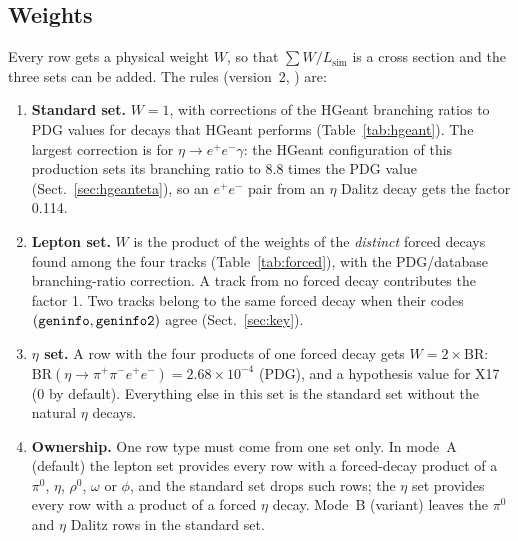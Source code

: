 \documentclass[11pt,a4paper]{article}
\newcommand{\piz}{\ensuremath{\pi^{0}}\xspace}
\newcommand{\ee}{\ensuremath{e^{+}e^{-}}\xspace}
\newcommand{\ppee}{\ensuremath{\pi^{+}\pi^{-}e^{+}e^{-}}\xspace}
\newcommand{\Lsim}{\ensuremath{L_{\mathrm{sim}}}\xspace}
\newcommand{\code}[1]{\texttt{\detokenize{#1}}}
\begin{document}
\subsection{Weights}
\label{sec:weights}
Every row gets a physical weight $W$, so that $\sum W/\Lsim$ is a cross section and the
three sets can be added. The rules (version~2, \code{src/sim_truth.h}) are:
\begin{enumerate}
\item \textbf{Standard set.} $W=1$, with corrections of the HGeant branching ratios to PDG
      values for decays that HGeant performs (Table~\ref{tab:hgeant}). The largest correction
      is for $\eta\to\ee\gamma$: the HGeant configuration of this production sets its branching
      ratio to 8.8 times the PDG value (Sect.~\ref{sec:hgeanteta}), so an \ee pair from an $\eta$
      Dalitz decay gets the factor 0.114.
\item \textbf{Lepton set.} $W$ is the product of the weights of the \emph{distinct} forced
      decays found among the four tracks (Table~\ref{tab:forced}), with the PDG/database
      branching-ratio correction. A track from no forced decay contributes the factor 1.
      Two tracks belong to the same forced decay when their codes $(\code{geninfo},
      \code{geninfo2})$ agree (Sect.~\ref{sec:key}).
\item \textbf{$\eta$ set.} A row with the four products of one forced decay gets
      $W = 2\times\mathrm{BR}$: $\mathrm{BR}(\eta\to\ppee) = 2.68\times10^{-4}$ (PDG), and a
      hypothesis value for X17 (0 by default). Everything else in this set is the standard
      set without the natural $\eta$ decays.
\item \textbf{Ownership.} One row type must come from one set only. In mode~A (default) the
      lepton set provides every row with a forced-decay product of a \piz, $\eta$, $\rho^0$,
      $\omega$ or $\phi$, and the standard set drops such rows; the $\eta$ set provides every
      row with a product of a forced $\eta$ decay. Mode~B (variant) leaves the \piz and $\eta$
      Dalitz rows in the standard set.
\end{enumerate}
\end{document}
